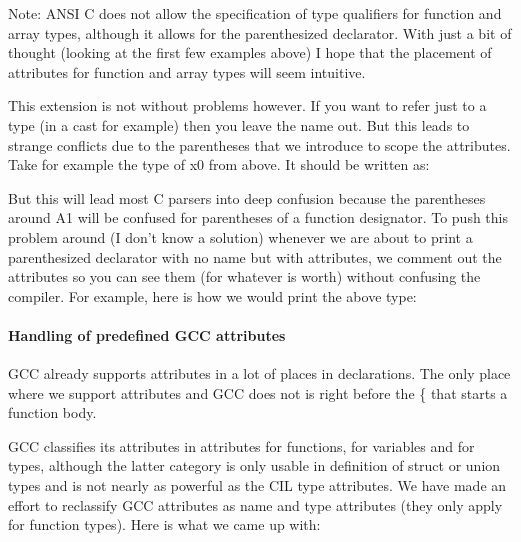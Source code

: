\documentclass{article}
\begin{document}
 Note: ANSI C does not allow the specification of type qualifiers for function
and array types, although it allows for the parenthesized declarator. With
just a bit of thought (looking at the first few examples above) I hope that
the placement of attributes for function and array types will seem intuitive.

 This extension is not without problems however. If you want to refer just to
a type (in a cast for example) then you leave the name out. But this leads to
strange conflicts due to the parentheses that we introduce to scope the
attributes. Take for example the type of x0 from above. It should be written
as: 
 

 But this will lead most C parsers into deep confusion because the parentheses
around A1 will be confused for parentheses of a function designator. To push
this problem around (I don't know a solution) whenever we are about to print a
parenthesized declarator with no name but with attributes, we comment out the
attributes so you can see them (for whatever is worth) without confusing the
compiler. For example, here is how we would print the above type:


 \paragraph{Handling of predefined GCC attributes}

 GCC already supports attributes in a lot of places in declarations. The only
place where we support attributes and GCC does not is right before the \{ that
starts a function body. 

 GCC classifies its attributes in attributes for functions, for variables and
for types, although the latter category is only usable in definition of struct
or union types and is not nearly as powerful as the CIL type attributes. We
have made an effort to reclassify GCC attributes as name and type attributes
(they only apply for function types). Here is what we came up with:
\end{document}
